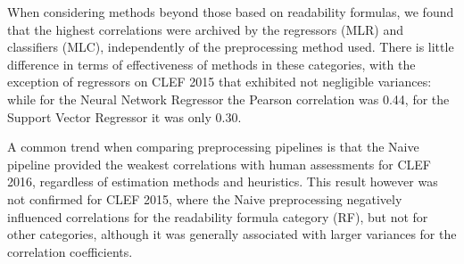 When considering methods beyond those based on readability formulas, we found that the highest correlations were archived by the regressors (MLR) and classifiers (MLC), independently of the preprocessing method used. There is little difference in terms of effectiveness of methods in these categories, with the exception of regressors on CLEF 2015 that exhibited not negligible variances: while for the Neural Network Regressor the Pearson correlation was 0.44, for the Support Vector Regressor it was only 0.30.

A common trend when comparing preprocessing pipelines is that the Naive pipeline provided the weakest correlations with human assessments for CLEF 2016, regardless of estimation methods and heuristics. This result however was not confirmed for CLEF 2015, where the Naive preprocessing negatively influenced correlations for the readability formula category (RF), but not for other categories, although it was generally associated with larger variances for the correlation coefficients.





